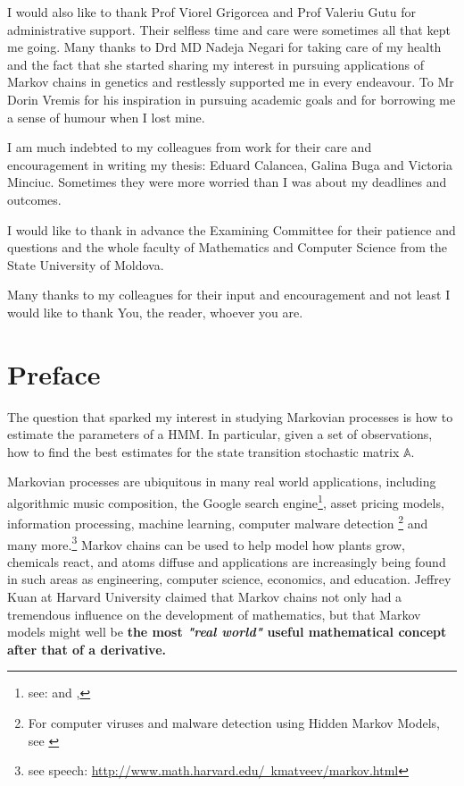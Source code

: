 \documentclass[a4paper,12pt]{article}
\theoremstyle{definition}
\begin{document}
I would also like to thank Prof Viorel Grigorcea and Prof Valeriu Gutu for administrative support. Their selfless time and care were sometimes all that kept me going.
Many thanks to Drd MD Nadeja Negari for taking care of my health and the fact that she started sharing my interest in pursuing applications of Markov chains in genetics and restlessly supported me in every endeavour.  To Mr Dorin Vremis for his inspiration in pursuing academic goals and for borrowing me a sense of humour when I lost mine. 

I am much indebted to my colleagues from work for their care and encouragement in writing my thesis: Eduard Calancea, Galina Buga and Victoria Minciuc. Sometimes they were more worried than I was about my deadlines and outcomes.

I would like to thank in advance the Examining Committee for their patience and questions and the whole faculty of Mathematics and Computer Science from the State University of Moldova. 

Many thanks to my colleagues for their input and encouragement and not least I would like to thank You, the reader, whoever you are. 
\newpage
\setcounter{secnumdepth}{0}
\section{Preface}
\setcounter{secnumdepth}{1}

The question that sparked my interest in studying Markovian processes is how to estimate the parameters of a HMM. In particular, given a set of observations, how to find the best estimates for the state transition stochastic matrix $\mathbb{A}$.

Markovian processes are ubiquitous in many real world applications, including algorithmic music composition, the Google search engine\footnote{see: \cite{langville2011google} and \cite{Stachurski2008}, }, asset pricing models, information processing, machine learning, computer malware detection \footnote{For computer viruses and malware detection using Hidden Markov Models, see \citep{lin2011hunting} } and many more.\footnote{ see speech: \href{http://www.math.harvard.edu/~kmatveev/markov.html}{http://www.math.harvard.edu/~kmatveev/markov.html}} Markov chains can be used to help model how plants grow, chemicals react, and atoms diffuse and applications are increasingly being found in such areas as engineering, computer science, economics, and education. Jeffrey Kuan at Harvard University claimed that Markov chains not only had a tremendous influence on the development of mathematics, but that Markov models might well be \textbf{ the most \textit{"real world"} useful mathematical concept after that of a derivative.}
\end{document}
